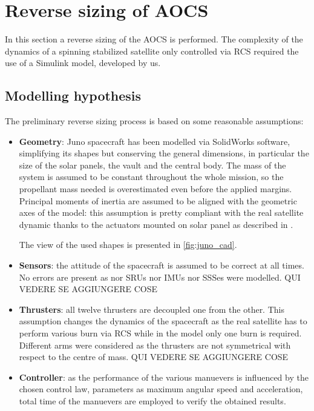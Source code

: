 \section{Reverse sizing of AOCS}
\label{sec:AOCS_sizing}

In this section a reverse sizing of the AOCS is performed. The complexity of the dynamics of a spinning stabilized satellite only controlled via RCS required the use of a Simulink model, developed by us. 

\subsection{Modelling hypothesis}
\label{subsec: mod_hypo}
The preliminary reverse sizing process is based on some reasonable assumptions:

\begin{itemize}
    \item \textbf{Geometry}: Juno spacecraft has been modelled via SolidWorks software, simplifying its shapes but conserving the general dimensions, in particular the size of the solar panels, the vault and the central body. The mass of the system is assumed to be constant throughout the whole mission, so the propellant mass needed is overestimated even before the applied margins. 
    Principal moments of inertia are assumed to be aligned with the geometric axes of the model: this assumption is pretty compliant with the real satellite dynamic thanks to the actuators mounted on solar panel as described in \mref. 
       
    The view of the used shapes is presented in \autoref{fig:juno_cad}.

    \item \textbf{Sensors}: the attitude of the spacecraft is assumed to be correct at all times. No errors are present as nor SRUs nor IMUs nor SSSes were modelled. QUI VEDERE SE AGGIUNGERE COSE
    
    \item \textbf{Thrusters}: all twelve thrusters are decoupled one from the other. This assumption changes the  dynamics of the spacecraft as the real satellite has to perform various burn via RCS while in the model only one burn is required. %
    Different arms were considered as the thrusters are not symmetrical with respect to the centre of mass. QUI VEDERE SE AGGIUNGERE COSE

    \item \textbf{Controller}: as the performance of the various manuevers is influenced by the chosen control law, parameters as maximum angular speed and acceleration, total time of the manuevers are employed to verify the obtained results. 
    

\end{itemize}

